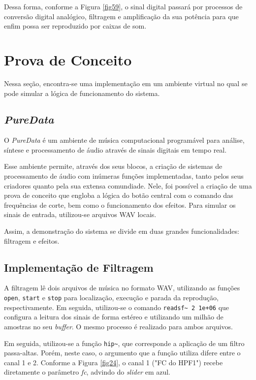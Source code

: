 Dessa forma, conforme a Figura \ref{fig59}, o sinal digital passará por processos de conversão digital analógico, filtragem e amplificação da sua potência para que enfim possa ser reproduzido por caixas de som.

\newpage
\section{Prova de Conceito}

Nessa seção, encontra-se uma implementação em um ambiente virtual no qual se pode simular a lógica de funcionamento do sistema.

	\subsection{\textit{PureData}}
    O \textit{PureData} \cite{puredata} é um ambiente de música computacional programável para análise, síntese e processamento de áudio através de sinais digitais em tempo real. 
    

    Esse ambiente permite, através dos seus blocos, a criação de sistemas de processamento de áudio com inúmeras funções implementadas, tanto pelos seus criadores quanto pela sua extensa comundiade. Nele, foi possível a criação de uma prova de conceito que engloba a lógica do botão central com o comando das frequências de corte, bem como o funcionamento dos efeitos. Para simular os sinais de entrada, utilizou-se arquivos WAV locais.

    Assim, a demonstração do sistema se divide em duas grandes funcionalidades: filtragem e efeitos.

	\subsection{Implementação de Filtragem}

    A filtragem lê dois arquivos de música no formato WAV, utilizando as funções \texttt{open}, \texttt{start} e \texttt{stop} para localização, execução e parada da reprodução, respectivamente. Em seguida, utilizou-se o comando \texttt{readsf\textasciitilde\ 2 1e+06} que configura a leitura dos sinais de forma estéreo e utilizando um milhão de amostras no seu \textit{buffer}. O mesmo processo é realizado para ambos arquivos. 

    Em seguida, utilizou-se a função \texttt{hip\textasciitilde}, que corresponde a aplicação de um filtro passa-altas. Porém, neste caso, o argumento que a função utiliza difere entre o canal 1 e 2. Conforme a Figura \ref{fig24}, o canal 1 ("FC do HPF1") recebe diretamente o parâmetro \textit{fc}, advindo do \textit{slider} em azul.
    
